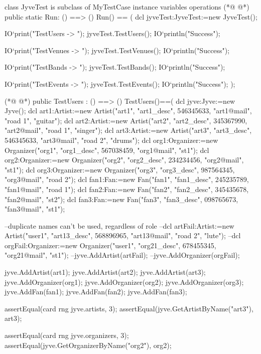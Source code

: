 \begin{vdmpp}[breaklines=true]
class JyveTest is subclass of MyTestCase
instance variables
operations
(*@
\label{Run:4}
@*)
 public static Run: () ==> ()
 Run() == 
 (
  dcl jyveTest:JyveTest:=new JyveTest();
  
  IO`print("TestUsers -> ");
  jyveTest.TestUsers();
  IO`println("Success");
  
  IO`print("TestVenues -> ");
  jyveTest.TestVenues();
  IO`println("Success");
  
  IO`print("TestBands -> ");
  jyveTest.TestBands();
  IO`println("Success");
  
  IO`print("TestEvents -> ");
  jyveTest.TestEvents();
  IO`println("Success");
 );
 
(*@
\label{TestUsers:26}
@*)
 public TestUsers : () ==> ()
 TestUsers()==(
  dcl jyve:Jyve:=new Jyve();
  dcl art1:Artist:=new Artist("art1", "art1_desc", 546345633, "art1@mail", "road 1", "guitar");
  dcl art2:Artist:=new Artist("art2", "art2_desc", 345367990, "art2@mail", "road 1", "singer");
  dcl art3:Artist:=new Artist("art3", "art3_desc", 546345633, "art3@mail", "road 2", "drums");
  dcl org1:Organizer:=new Organizer("org1", "org1_desc", 567038459, "org1@mail", "st1");
  dcl org2:Organizer:=new Organizer("org2", "org2_desc", 234234456, "org2@mail", "st1");
  dcl org3:Organizer:=new Organizer("org3", "org3_desc", 987564345, "org3@mail", "road 2");
  dcl fan1:Fan:=new Fan("fan1", "fan1_desc", 245235789, "fan1@mail", "road 1");
  dcl fan2:Fan:=new Fan("fan2", "fan2_desc", 345435678, "fan2@mail", "st2");
  dcl fan3:Fan:=new Fan("fan3", "fan3_desc", 098765673, "fan3@mail", "st1");
  
  --duplicate names can't be used, regardless of role
  --dcl artFail:Artist:=new Artist("user1", "art13_desc", 568896965, "art13@mail", "road 2", "lute");
  --dcl orgFail:Organizer:=new Organizer("user1", "org21_desc", 678455345, "org21@mail", "st1");
  --jyve.AddArtist(artFail);
  --jyve.AddOrganizer(orgFail);
  
  
  jyve.AddArtist(art1);
  jyve.AddArtist(art2);
  jyve.AddArtist(art3);
  jyve.AddOrganizer(org1);
  jyve.AddOrganizer(org2);
  jyve.AddOrganizer(org3);
  jyve.AddFan(fan1);
  jyve.AddFan(fan2);
  jyve.AddFan(fan3);
  
  assertEqual(card rng jyve.artists, 3);
  assertEqual(jyve.GetArtistByName("art3"), art3);
  
  assertEqual(card rng jyve.organizers, 3);
  assertEqual(jyve.GetOrganizerByName("org2"), org2);
  

\end{vdmpp}
